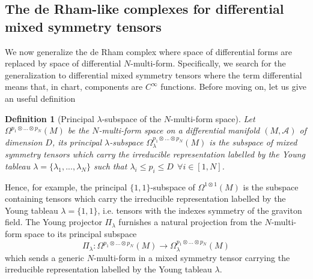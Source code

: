 \documentclass[a4paper,12pt]{article}
\newtheorem{Definition}{Definition}[section]
\begin{document}
\subsection{The de Rham-like complexes for differential mixed symmetry tensors}\label{derhamcomgen}
We now generalize the de Rham complex where space of differential forms are replaced by space of differential $N$-multi-form. Specifically, we search for the generalization to differential mixed symmetry tensors where the term differential means that, in chart, components are $C^{\infty}$ functions. Before moving on, let us give an useful definition 
\begin{Definition}[Principal $\lambda$-subspace of the $N$-multi-form space]
    Let $\Omega^{p_1\otimes ... \otimes p_N}(M)$ be the $N$-multi-form space on a differential manifold $(M,\mathcal{A})$ of dimension $D$, its principal $\lambda$-subspace $\Omega_{\lambda}^{p_1\otimes ... \otimes p_N}(M)$ is the subspace of mixed symmetry tensors which carry the irreducible representation labelled by the Young tableau $\lambda=\{\lambda_1,...,\lambda_N\}$ such that $\lambda_i \leq p_i\leq D \ \ \forall i\in [1,N]$.
\end{Definition}
Hence, for example, the principal $\{1,1\}$-subspace of $\Omega^{1 \otimes 1}(M)$ is the subspace containing tensors which carry the irreducible representation labelled by the Young tableau $\lambda=\{1,1\}$, i.e. tensors with the indexes symmetry of the graviton field. The Young projector $\Pi_{\lambda}$ furnishes a natural projection from the $N$-multi-form space to its principal subspace 
\begin{equation}
   \Pi_{\lambda}: \Omega^{p_1\otimes ... \otimes p_N}(M) \rightarrow \Omega_{\lambda}^{p_1\otimes ... \otimes p_N}(M)
\end{equation}
which sends a generic $N$-multi-form in a mixed symmetry tensor carrying the irreducible representation labelled by the Young tableau $\lambda$. 
\end{document}
